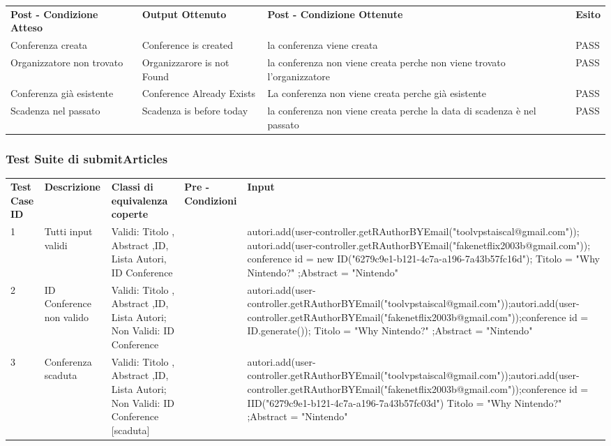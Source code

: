 \begin{tabular}{|p{3.5cm}|p{3cm}|p{3cm}|p{1cm}|}
\hline
\rowcolor{SkyBlue}
\multicolumn{4}{l}{\textbf{createConferenc p2}}\\
\hline
\rowcolor{Red}
 \textbf{Post - Condizione Atteso} & \textbf{Output Ottenuto}& \textbf{Post - Condizione Ottenute}& \textbf{Esito}\\
\hline
Conferenza creata& Conference is created & la conferenza viene creata & PASS\\
\hline
Organizzatore non trovato&Organizzarore is not Found& la conferenza non viene creata perche non viene trovato l'organizzatore & PASS\\
\hline
Conferenza già esistente&Conference Already Exists& La conferenza non viene creata perche già esistente& PASS\\
\hline
Scadenza nel passato&Scadenza is before today&la conferenza non viene creata perche la data di scadenza è nel passato& PASS\\ 
\hline
\end{tabular}

\subsubsection{Test Suite di submitArticles}
\begin{tabular}{|p{2.5cm}|p{2.5cm}|p{3cm}|p{1.5cm}|p{4cm}|}
\hline
\rowcolor{SkyBlue}
\multicolumn{5}{l}{\textbf{submitArticles p1}}\\
\hline
\rowcolor{Red}
\textbf{Test Case ID} & \textbf{Descrizione} & \textbf{Classi di equivalenza coperte} & \textbf{Pre - Condizioni} & \textbf{Input} \\
\hline
1 & Tutti input validi &  Validi: Titolo , Abstract ,ID, Lista Autori, ID Conference && autori.add(user-controller.getRAuthorBYEmail("toolvpstaiscal@gmail.com")); autori.add(user-controller.getRAuthorBYEmail("fakenetflix2003b@gmail.com")); conference id = new ID("6279c9e1-b121-4c7a-a196-7a43b57fc16d"); Titolo = "Why Nintendo?" ;Abstract = "Nintendo" \\
\hline
2& ID Conference non valido &Validi:   Titolo , Abstract ,ID, Lista Autori; Non Validi: ID Conference  &&autori.add(user-controller.getRAuthorBYEmail("toolvpstaiscal@gmail.com"));autori.add(user-controller.getRAuthorBYEmail("fakenetflix2003b@gmail.com"));conference id = ID.generate()); Titolo = "Why Nintendo?" ;Abstract = "Nintendo" \\
\hline
3& Conferenza scaduta & Validi: Titolo , Abstract ,ID, Lista Autori; Non Validi: ID Conference [scaduta] &&autori.add(user-controller.getRAuthorBYEmail("toolvpstaiscal@gmail.com"));autori.add(user-controller.getRAuthorBYEmail("fakenetflix2003b@gmail.com"));conference id = IID("6279c9e1-b121-4c7a-a196-7a43b57fc03d") Titolo = "Why Nintendo?" ;Abstract = "Nintendo"\\
\hline
\end{tabular}

